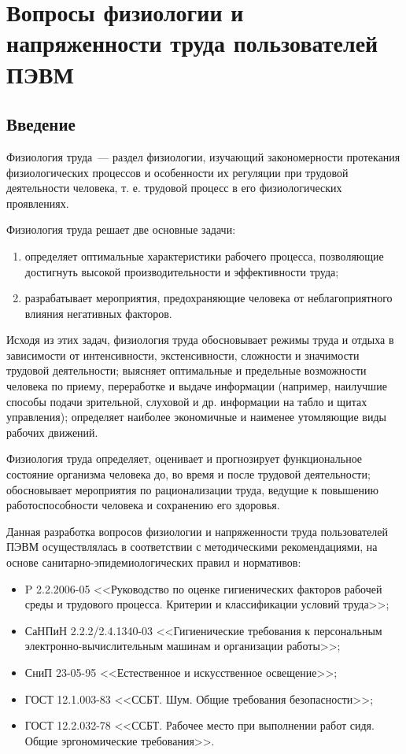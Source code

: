 \renewcommand{\ESKDtheColumnXIfII}{\ESKDfontII\text{Горешник~И.Д.}}
\updateStamp
{}
\section{Вопросы физиологии и напряженности труда пользователей ПЭВМ}
\subsection*{Введение}
Физиология труда~--- раздел физиологии, изучающий закономерности протекания физиологических процессов и особенности их регуляции при трудовой деятельности человека, т. е. трудовой процесс в его физиологических проявлениях. 

Физиология труда решает две основные задачи:
\begin{enumerate}
\item определяет оптимальные характеристики рабочего процесса, позволяющие достигнуть высокой производительности и эффективности труда;
\item разрабатывает мероприятия, предохраняющие человека от неблагоприятного влияния негативных факторов.
\end{enumerate}

Исходя из этих задач, физиология труда обосновывает режимы труда и отдыха в зависимости от интенсивности, экстенсивности, сложности и значимости трудовой деятельности; выясняет оптимальные и предельные возможности человека по приему, переработке и выдаче информации (например, наилучшие способы подачи зрительной, слуховой и др. информации на табло и щитах управления); определяет наиболее экономичные и наименее утомляющие виды рабочих движений.

Физиология труда определяет, оценивает и прогнозирует функциональное состояние организма человека до, во время и после трудовой деятельности; обосновывает мероприятия по рационализации труда, ведущие к повышению работоспособности человека и сохранению его здоровья.

Данная разработка вопросов физиологии и напряженности труда пользователей ПЭВМ осуществлялась в соответствии с методическими рекомендациями, на основе санитарно-эпидемиологических правил и нормативов:
\begin{itemize}
\item P 2.2.2006-05 <<Руководство по оценке гигиенических факторов рабочей среды и трудового процесса. Критерии и классификации условий труда>>;
\item СаНПиН 2.2.2/2.4.1340-03 <<Гигиенические требования к персональным электронно-вычислительным машинам и организации работы>>;
\item СниП 23-05-95 <<Естественное и искусственное освещение>>;
\item ГОСТ 12.1.003-83 <<ССБТ. Шум. Общие требования безопасности>>;
\item ГОСТ 12.2.032-78 <<ССБТ. Рабочее место при выполнении работ сидя. Общие эргономические требования>>.
\end{itemize}

